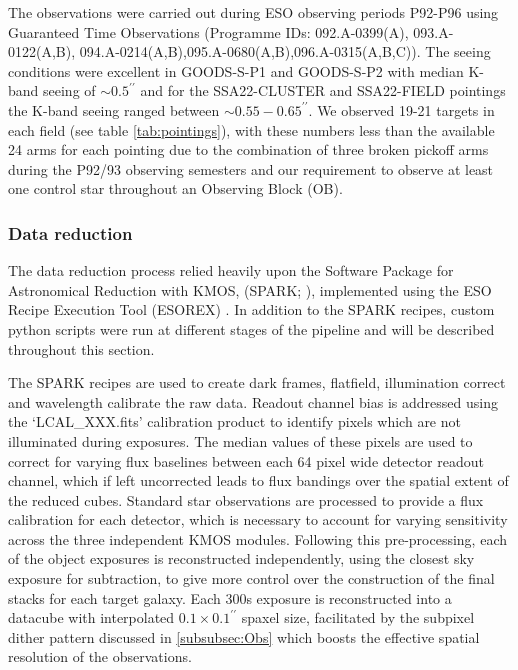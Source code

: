 \documentclass[fleqn,usenatbib]{mn2e}
\begin{document}
The observations were carried out during ESO observing periods P92-P96 using Guaranteed Time Observations (Programme IDs: 092.A-0399(A), 093.A-0122(A,B), 094.A-0214(A,B),095.A-0680(A,B),096.A-0315(A,B,C)).
The seeing conditions were excellent in GOODS-S-P1 and GOODS-S-P2 with median K-band seeing of $\sim 0.5^{\prime\prime}$ and for the SSA22-CLUSTER and SSA22-FIELD pointings the K-band seeing ranged between $\sim 0.55-0.65^{\prime\prime}$.
We observed 19-21 targets in each field (see table \ref{tab:pointings}), with these numbers less than the available 24 arms for each pointing due to the combination of three broken pickoff arms during the P92/93 observing semesters and our requirement to observe at least one control star throughout an Observing Block (OB). \\

\subsubsection{Data reduction}\label{subsubsec:datareduction}
The data reduction process relied heavily upon the Software Package for Astronomical Reduction with KMOS, (SPARK; \cite{Davies2013}), implemented using the ESO Recipe Execution Tool (ESOREX) \citep{Freudling2013}.
In addition to the SPARK recipes, custom python scripts were run at different stages of the pipeline and will be described throughout this section.

The SPARK recipes are used to create dark frames, flatfield, illumination correct and wavelength calibrate the raw data.
Readout channel bias is addressed using the `LCAL\_XXX.fits' calibration product to identify pixels which are not illuminated during exposures.
The median values of these pixels are used to correct for varying flux baselines between each 64 pixel wide detector readout channel, which if left uncorrected leads to flux bandings over the spatial extent of the reduced cubes.
Standard star observations are processed to provide a flux calibration for each detector, which is necessary to account for varying sensitivity across the three independent KMOS modules. 
Following this pre-processing, each of the object exposures is reconstructed independently, using the closest sky exposure for subtraction, to give more control over the construction of the final stacks for each target galaxy.
Each 300s exposure is reconstructed into a datacube with interpolated $0.1\times0.1^{\prime\prime}$ spaxel size, facilitated by the subpixel dither pattern discussed in \cref{subsubsec:Obs} which boosts the effective spatial resolution of the observations. \\
\end{document}
